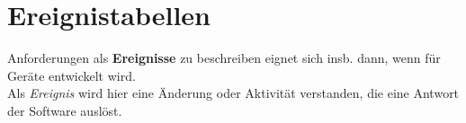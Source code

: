 \section{Ereignistabellen}
Anforderungen als \textbf{Ereignisse} zu beschreiben eignet sich insb. dann, wenn für Geräte entwickelt wird.\\

\noindent
Als \textit{Ereignis} wird hier eine Änderung oder Aktivität verstanden, die eine Antwort der Software auslöst.


